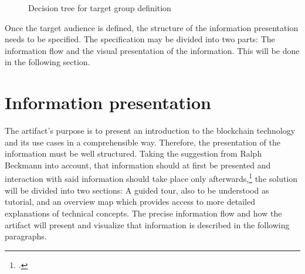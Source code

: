\begin{figure}
    \centering
    
    \caption{Decision tree for target group definition}
    \label{fig:TargetGroup}
\end{figure}

Once the target audience is defined, the structure of the information presentation needs to be specified. The specification may be divided into two parts: The information flow and the visual presentation of the information. This will be done in the following section.

\section{Information presentation} \label{sec:InformationPresentation}
The artifact's purpose is to present an introduction to the blockchain technology and its use cases in a comprehensible way. Therefore, the presentation of the information must be well structured. Taking the suggestion from Ralph Beckmann into account, that information should at first be presented and interaction with said information should take place only afterwards,\footcite[Cf.][P115]{RalphBeckmann_Interview} the solution will be divided into two sections: A guided tour, also to be understood as tutorial, and an overview map which provides access to more detailed explanations of technical concepts. The precise information flow and how the artifact will present and visualize that information is described in the following paragraphs.

